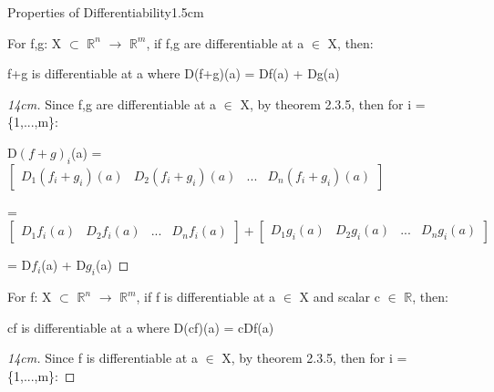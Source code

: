     \begin{ltheorem}{Properties of Differentiability}{1.5cm}
        \item For f,g: X $\subset$ $\mathbb{R}^n$ $\rightarrow$ $\mathbb{R}^m$,
            if f,g are differentiable at a $\in$ X, then:

            \hspace{0.5cm}
            f+g is differentiable at a where D(f+g)(a) = Df(a) + Dg(a)

            \begin{proof}[14cm]
                Since f,g are differentiable at a $\in$ X,
                by {\color{red} theorem 2.3.5}, then for i = \{1,...,m\}:

                \hspace{0.5cm}
                D$(f+g)_i$(a) =
                $
                \begin{bmatrix}
                    D_1(f_i+g_i)(a)
                    & D_2(f_i+g_i)(a)
                    & ...
                    & D_n(f_i+g_i)(a)
                \end{bmatrix}
                $

                \hspace{0.5cm}
                = $
                \begin{bmatrix}
                    D_1f_i(a)
                    & D_2f_i(a)
                    & ...
                    & D_nf_i(a)
                \end{bmatrix}
                + \begin{bmatrix}
                    D_1g_i(a)
                    & D_2g_i(a)
                    & ...
                    & D_ng_i(a)
                \end{bmatrix}
                $

                \hspace{0.5cm}
                = D$f_i$(a) + D$g_i$(a)
            \end{proof}

        \item For f: X $\subset$ $\mathbb{R}^n$ $\rightarrow$ $\mathbb{R}^m$,
            if f is differentiable at a $\in$ X and scalar c $\in$ $\mathbb{R}$,
            then:

            \hspace{0.5cm}
            cf is differentiable at a where D(cf)(a) = cDf(a)

            \begin{proof}[14cm]
                Since f is differentiable at a $\in$ X,
                by {\color{red} theorem 2.3.5}, then for i = \{1,...,m\}:


\end{proof}
\end{ltheorem}
